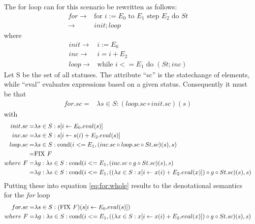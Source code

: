 % 
The for loop can for this scenario be rewritten as follows:
\begin{align}
	for	\to & \text{for } i := E_0 \text{ to } E_1 \text{ step } E_2 \text{ do } St \\
			\to & init; loop
\end{align}
where
\begin{align}
	init \to & i := E_0 \\
	inc	 \to & i = i+E_2 \\
	loop \to & \text{while } i <= E_1 \text{ do } (St; inc)
\end{align}
Let S be the set of all statuses. The attribute ``sc'' is the statechange of elements, while ``eval'' evaluates expressions based on a given status. Consequently it must be that
\begin{align}
	for.sc = & \lambda s \in S: (loop.sc \circ init.sc)( s ) \label{eq:for:whole}
\end{align}
with
\begin{align}
	init.sc = & \lambda s \in S: s[i \gets E_0.eval( s )] \\
	inc.sc 	= & \lambda s \in S: s[i \gets s( i ) + E_2.eval( s )] \\
	loop.sc = & \lambda s \in S: \text{cond}(i <= E_1, (inc.sc \circ loop.sc \circ St.sc)( s ), s) \\
					= & \text{FIX } F\\
where \ F = & \lambda g: \lambda s \in S: \text{cond}(i <= E_1, (inc.sc \circ g \circ St.sc)( s ), s) \\
					= & \lambda g: \lambda s \in S: \text{cond}(i <= E_1, ((\lambda x \in S: x[i \gets x( i ) + E_2.eval( x )]) \circ g \circ St.sc)(s), s)
\end{align}
Putting these into equation \ref{eq:for:whole} results to the denotational semantics for the \emph{for} loop
\begin{align}
	 for.sc = & \lambda s \in S: (\text{FIX } F)(s[i \gets E_0.eval( s )]) \\
where \ F = & \lambda g: \lambda s \in S: \text{cond}(i <= E_1, ((\lambda x \in S: x[i \gets x( i ) + E_2.eval( x )]) \circ g \circ St.sc)(s), s)
\end{align}